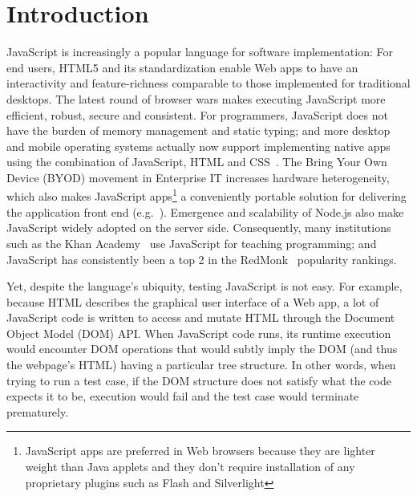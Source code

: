 \section{Introduction}
JavaScript is increasingly a popular language for software implementation: %
For end users, HTML5 and its standardization enable Web apps to have an interactivity and feature-richness comparable to those implemented for traditional desktops.  
The latest round of browser wars makes executing JavaScript more efficient, robust, secure and consistent.  
For programmers, JavaScript does not have the burden of memory management and static typing; and more desktop and mobile operating systems actually now support implementing native apps using the combination of JavaScript, HTML and CSS~\cite{jalangi}.
The Bring Your Own Device (BYOD) movement in Enterprise IT increases hardware heterogeneity, which also makes JavaScript apps\footnote{JavaScript apps are preferred in Web browsers because they are lighter weight than Java applets and they don't require installation of any proprietary plugins such as Flash and Silverlight} a conveniently portable solution for delivering the application front end (e.g.~\cite{BNSFoffice365}).
Emergence and scalability of Node.js also make JavaScript widely adopted on the server side.
Consequently, many institutions such as the Khan Academy~\cite{khanAcademy} use JavaScript for teaching programming; and JavaScript has consistently been a top 2 in the RedMonk~\cite{redmonk} popularity rankings.%

Yet, despite the language's ubiquity, testing JavaScript is not easy.  
For example, because HTML describes the graphical user interface of a Web app, a lot of JavaScript code is written to access and mutate HTML through the Document Object Model (DOM) API.  
When JavaScript code runs, its runtime execution would encounter DOM operations that would subtly imply the DOM (and thus the webpage's HTML) having a particular tree structure.  
In other words, when trying to run a test case, if the DOM structure does not satisfy what the code expects it to be, execution would fail and the test case would terminate prematurely.  

